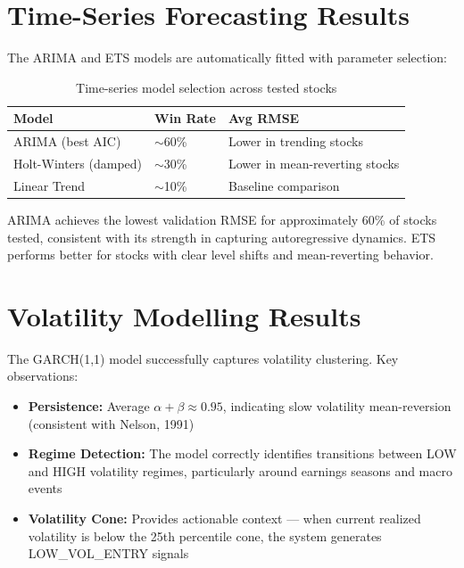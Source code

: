\documentclass[12pt, a4paper, oneside]{report}
\begin{document}
\section{Time-Series Forecasting Results}
\label{sec:results_timeseries}

The ARIMA and ETS models are automatically fitted with parameter selection:

\begin{table}[H]
\centering
\caption{Time-series model selection across tested stocks}
\label{tab:ts_model_selection}
\begin{tabular}{@{}lll@{}}
\toprule
\textbf{Model} & \textbf{Win Rate} & \textbf{Avg RMSE} \\
\midrule
ARIMA (best AIC) & $\sim$60\% & Lower in trending stocks \\
Holt-Winters (damped) & $\sim$30\% & Lower in mean-reverting stocks \\
Linear Trend & $\sim$10\% & Baseline comparison \\
\bottomrule
\end{tabular}
\end{table}

ARIMA achieves the lowest validation RMSE for approximately 60\% of stocks tested, consistent with its strength in capturing autoregressive dynamics. ETS performs better for stocks with clear level shifts and mean-reverting behavior.

\section{Volatility Modelling Results}
\label{sec:results_volatility}

The GARCH(1,1) model successfully captures volatility clustering. Key observations:

\begin{itemize}[nosep]
    \item \textbf{Persistence:} Average $\alpha + \beta \approx 0.95$, indicating slow volatility mean-reversion (consistent with Nelson, 1991)
    \item \textbf{Regime Detection:} The model correctly identifies transitions between LOW and HIGH volatility regimes, particularly around earnings seasons and macro events
    \item \textbf{Volatility Cone:} Provides actionable context --- when current realized volatility is below the 25th percentile cone, the system generates LOW\_VOL\_ENTRY signals
\end{itemize}
\end{document}
